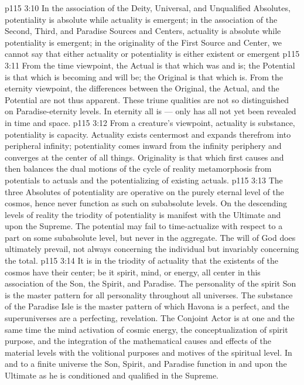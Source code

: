 \vs p115 3:10 In the association of the Deity, Universal, and Unqualified Absolutes, potentiality is absolute while actuality is emergent; in the association of the Second, Third, and Paradise Sources and Centers, actuality is absolute while potentiality is emergent; in the originality of the First Source and Center, we cannot say that either actuality or potentiality is either existent or emergent 
\vs p115 3:11 From the time viewpoint, the Actual is that which was and is; the Potential is that which is becoming and will be; the Original is that which is. From the eternity viewpoint, the differences between the Original, the Actual, and the Potential are not thus apparent. These triune qualities are not so distinguished on Paradise\hyp{}eternity levels. In eternity all is --- only has all not yet been revealed in time and space.
\vs p115 3:12 From a creature’s viewpoint, actuality is substance, potentiality is capacity. Actuality exists centermost and expands therefrom into peripheral infinity; potentiality comes inward from the infinity periphery and converges at the center of all things. Originality is that which first causes and then balances the dual motions of the cycle of reality metamorphosis from potentials to actuals and the potentializing of existing actuals.
\vs p115 3:13 The three Absolutes of potentiality are operative on the purely eternal level of the cosmos, hence never function as such on subabsolute levels. On the descending levels of reality the triodity of potentiality is manifest with the Ultimate and upon the Supreme. The potential may fail to time\hyp{}actualize with respect to a part on some subabsolute level, but never in the aggregate. The will of God does ultimately prevail, not always concerning the individual but invariably concerning the total.
\vs p115 3:14 It is in the triodity of actuality that the existents of the cosmos have their center; be it spirit, mind, or energy, all center in this association of the Son, the Spirit, and Paradise. The personality of the spirit Son is the master pattern for all personality throughout all universes. The substance of the Paradise Isle is the master pattern of which Havona is a perfect, and the superuniverses are a perfecting, revelation. The Conjoint Actor is at one and the same time the mind activation of cosmic energy, the conceptualization of spirit purpose, and the integration of the mathematical causes and effects of the material levels with the volitional purposes and motives of the spiritual level. In and to a finite universe the Son, Spirit, and Paradise function in and upon the Ultimate as he is conditioned and qualified in the Supreme.
